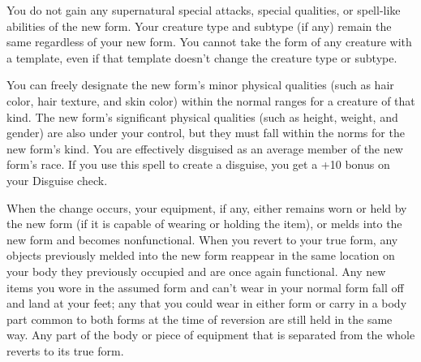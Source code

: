 {	You do not gain any supernatural special attacks, special qualities, or spell-like abilities of the new form. Your creature type and subtype (if any) remain the same regardless of your new form. You cannot take the form of any creature with a template, even if that template doesn't change the creature type or subtype.

	You can freely designate the new form's minor physical qualities (such as hair color, hair texture, and skin color) within the normal ranges for a creature of that kind. The new form's significant physical qualities (such as height, weight, and gender) are also under your control, but they must fall within the norms for the new form's kind. You are effectively disguised as an average member of the new form's race. If you use this spell to create a disguise, you get a +10 bonus on your Disguise check.

	When the change occurs, your equipment, if any, either remains worn or held by the new form (if it is capable of wearing or holding the item), or melds into the new form and becomes nonfunctional. When you revert to your true form, any objects previously melded into the new form reappear in the same location on your body they previously occupied and are once again functional. Any new items you wore in the assumed form and can't wear in your normal form fall off and land at your feet; any that you could wear in either form or carry in a body part common to both forms at the time of reversion are still held in the same way. Any part of the body or piece of equipment that is separated from the whole reverts to its true form.

}

